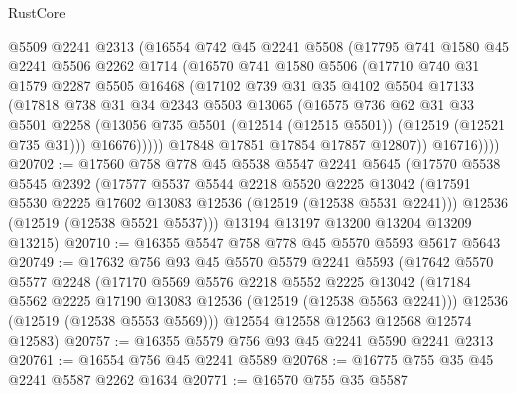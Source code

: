 \begin{lexlean}{RustCore}
\begin{coremodule}
            @5509
            @2241
            @2313
            (@16554
              @742
              @45
              @2241
              @5508
              (@17795
                @741
                @1580
                @45
                @2241
                @5506
                @2262
                @1714
                (@16570
                  @741
                  @1580
                  @5506
                  (@17710
                    @740
                    @31
                    @1579
                    @2287
                    @5505
                    @16468
                    (@17102
                      @739
                      @31
                      @35
                      @4102
                      @5504
                      @17133
                      (@17818
                        @738
                        @31
                        @34
                        @2343
                        @5503
                        @13065
                        (@16575
                          @736
                          @62
                          @31
                          @33
                          @5501
                          @2258
                          (@13056 @735 @5501 (@12514 (@12515 @5501)) (@12519 (@12521 @735 @31)))
                          @16676)))))
                @17848
                @17851
                @17854
                @17857
                @12807))
            @16716))))
@20702 := @17560
    @758
    @778
    @45
    @5538
    @5547
    @2241
    @5645
    (@17570
      @5538
      @5545
      @2392
      (@17577
        @5537
        @5544
        @2218
        @5520
        @2225
        @13042
        (@17591 @5530 @2225 @17602 @13083 @12536 (@12519 (@12538 @5531 @2241)))
        @12536
        (@12519 (@12538 @5521 @5537)))
      @13194
      @13197
      @13200
      @13204
      @13209
      @13215)
@20710 := @16355 @5547 @758 @778 @45 @5570 @5593 @5617 @5643
@20749 := @17632
    @756
    @93
    @45
    @5570
    @5579
    @2241
    @5593
    (@17642
      @5570
      @5577
      @2248
      (@17170
        @5569
        @5576
        @2218
        @5552
        @2225
        @13042
        (@17184 @5562 @2225 @17190 @13083 @12536 (@12519 (@12538 @5563 @2241)))
        @12536
        (@12519 (@12538 @5553 @5569)))
      @12554
      @12558
      @12563
      @12568
      @12574
      @12583)
@20757 := @16355 @5579 @756 @93 @45 @2241 @5590 @2241 @2313
@20761 := @16554 @756 @45 @2241 @5589
@20768 := @16775 @755 @35 @45 @2241 @5587 @2262 @1634
@20771 := @16570 @755 @35 @5587

\end{coremodule}
\end{lexlean}
